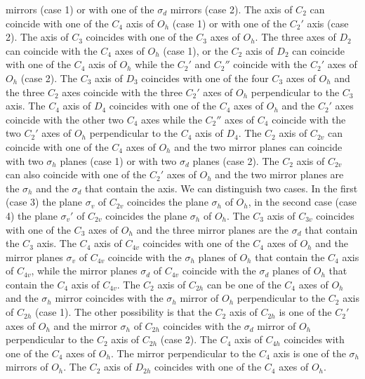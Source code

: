 \documentclass[12pt,a4paper]{article}
\begin{document}
mirrors (case 1) or with one of the $\sigma_d$ mirrors (case 2). The axis
of $C_2$ can coincide with one of the $C_4$ axis of $O_h$ (case 1) or
with one of the $C_2'$ axis (case 2). The axis of $C_3$ coincides with one
of the $C_3$ axes of $O_h$. The three axes of $D_2$ can coincide with the
$C_4$ axes of $O_h$ (case 1), or the $C_2$ axis of $D_2$ can coincide with one
of the $C_4$ axis of $O_h$ while the $C_2'$ and $C_2''$ coincide 
with the $C_2'$ axes of $O_h$ (case 2). The $C_3$ axis of $D_3$ coincides with
one of the four $C_3$ axes of $O_h$ and the three $C_2$ axes coincide with
the three $C_2'$ axes of $O_h$ perpendicular to the $C_3$ axis. The $C_4$
axis of $D_4$ coincides with one of the $C_4$ axes of $O_h$ and the
$C_2'$ axes coincide with the other two $C_4$ axes while the $C_2''$ axes
of $C_4$ coincide with the two $C_2'$ axes of $O_h$ perpendicular to the
$C_4$ axis of $D_4$. The $C_2$ axis of $C_{2v}$ can coincide with one of
the $C_4$ axes of $O_h$ and the two mirror planes can coincide with two
$\sigma_h$ planes (case 1) or with two $\sigma_d$ planes (case 2). The
$C_2$ axis of $C_{2v}$ can also coincide with one of the $C_2'$ axes
of $O_h$ and the two mirror planes are the $\sigma_h$ and the $\sigma_d$ 
that contain the axis. We can distinguish two cases. In the first (case 3)
the plane $\sigma_v$ of $C_{2v}$ coincides the plane $\sigma_h$ of $O_h$, 
in the second case (case 4) the plane $\sigma_v'$ of $C_{2v}$ coincides 
the plane $\sigma_h$ of $O_h$.
The $C_3$ axis of $C_{3v}$ coincides with one of the $C_3$ axes of $O_h$ and
the three mirror planes are the $\sigma_d$ that contain the $C_3$ axis.
The $C_4$ axis of $C_{4v}$ coincides with one of the $C_4$ axes of $O_h$
and the mirror planes $\sigma_v$ of $C_{4v}$ coincide with the $\sigma_h$
planes of $O_h$ that contain the $C_4$ axis of $C_{4v}$, 
while the mirror planes $\sigma_d$ of $C_{4v}$ coincide
with the $\sigma_d$ planes of $O_h$ that contain the $C_4$ axis of $C_{4v}$.
The $C_2$ axis of $C_{2h}$ can be one of the $C_4$ axes of $O_h$ and
the $\sigma_h$ mirror coincides with the $\sigma_h$ mirror of $O_h$ 
perpendicular to the $C_2$ axis of $C_{2h}$ (case 1).
The other possibility is that the $C_2$ axis of $C_{2h}$ is one of 
the $C_2'$ axes of $O_h$ and the mirror $\sigma_h$ of $C_{2h}$ coincides with
the $\sigma_d$ mirror of $O_h$ perpendicular to the $C_2$ axis of $C_{2h}$
(case 2). The $C_4$ axis of $C_{4h}$ coincides with one of the
$C_4$ axes of $O_h$. The mirror perpendicular to the $C_4$ axis is one of
the $\sigma_h$ mirrors of $O_h$. 
The $C_2$ axis of $D_{2h}$ coincides with one of the $C_4$ axes of $O_h$. 
\end{document}
